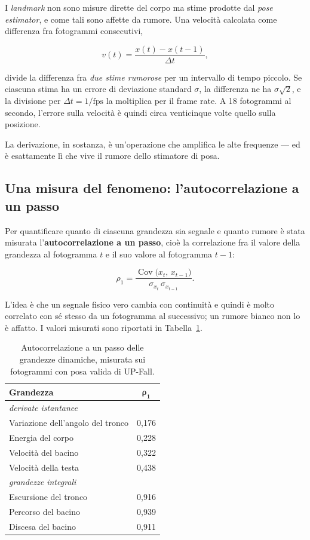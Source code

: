 I \emph{landmark} non sono misure dirette del corpo ma stime prodotte dal
\emph{pose estimator}, e come tali sono affette da rumore. Una velocità
calcolata come differenza fra fotogrammi consecutivi,

\[
v(t)=\frac{x(t)-x(t-1)}{\Delta t},
\]

divide la differenza fra \emph{due stime rumorose} per un intervallo di tempo
piccolo. Se ciascuna stima ha un errore di deviazione standard $\sigma$, la
differenza ne ha $\sigma\sqrt{2}$, e la divisione per $\Delta t = 1/\text{fps}$
la moltiplica per il frame rate. A 18 fotogrammi al secondo, l'errore sulla
velocità è quindi circa venticinque volte quello sulla posizione.

La derivazione, in sostanza, è un'operazione che amplifica le alte frequenze —
ed è esattamente lì che vive il rumore dello stimatore di posa.

\subsection{Una misura del fenomeno: l'autocorrelazione a un passo}

Per quantificare quanto di ciascuna grandezza sia segnale e quanto rumore è
stata misurata l'\textbf{autocorrelazione a un passo}, cioè la correlazione fra
il valore della grandezza al fotogramma $t$ e il suo valore al fotogramma
$t-1$:

\[
\rho_1 = \frac{\operatorname{Cov}\big(x_t,\,x_{t-1}\big)}
              {\sigma_{x_t}\,\sigma_{x_{t-1}}}.
\]

L'idea è che un segnale fisico vero cambia con continuità e quindi è molto
correlato con sé stesso da un fotogramma al successivo; un rumore bianco non lo
è affatto. I valori misurati sono riportati in
Tabella~\ref{tab:autocorrelazione}.

\begin{table}[ht]
\centering
\caption{Autocorrelazione a un passo delle grandezze dinamiche, misurata sui
fotogrammi con posa valida di UP-Fall.}
\label{tab:autocorrelazione}
\begin{tabular}{lc}
\hline
\textbf{Grandezza} & $\boldsymbol{\rho_1}$ \\
\hline
\multicolumn{2}{l}{\emph{derivate istantanee}} \\
\quad Variazione dell'angolo del tronco & 0,176 \\
\quad Energia del corpo & 0,228 \\
\quad Velocità del bacino & 0,322 \\
\quad Velocità della testa & 0,438 \\
\hline
\multicolumn{2}{l}{\emph{grandezze integrali}} \\
\quad Escursione del tronco & 0,916 \\
\quad Percorso del bacino & 0,939 \\
\quad Discesa del bacino & 0,911 \\
\hline
\end{tabular}
\end{table}

